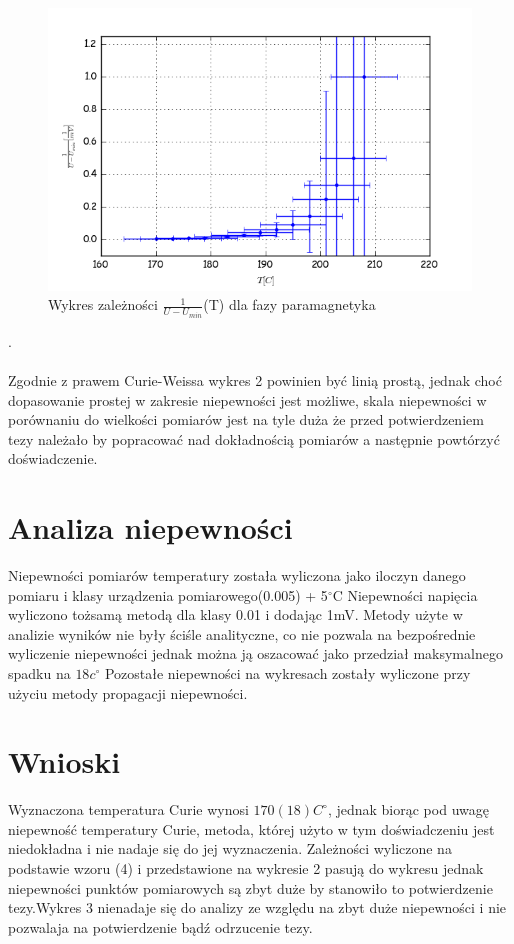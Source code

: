 \documentclass[a4paper,10pt]{article}
\begin{document}
\begin{figure}[H]
  \includegraphics{./Curie_odjete.png}
  \caption{Wykres zależności $\frac{1}{U-U_{min}}$(T) dla fazy paramagnetyka}
\end{figure}.
\\
\\Zgodnie z prawem Curie-Weissa wykres 2 powinien być linią prostą, jednak choć dopasowanie prostej w zakresie niepewności jest możliwe, skala niepewności w porównaniu do wielkości pomiarów jest na tyle duża że przed potwierdzeniem tezy należało by popracować nad dokładnością pomiarów a następnie powtórzyć doświadczenie.

\section{Analiza niepewności}
Niepewności pomiarów temperatury została wyliczona jako iloczyn danego pomiaru i klasy urządzenia pomiarowego(0.005) + 5$^\circ$C
Niepewności napięcia wyliczono tożsamą metodą dla klasy 0.01 i dodając 1mV. Metody użyte w analizie wyników nie były ściśle analityczne, co nie pozwala na bezpośrednie wyliczenie niepewności jednak można ją oszacować jako przedział maksymalnego spadku na $18c^\circ$ Pozostałe niepewności na wykresach zostały wyliczone przy użyciu metody propagacji niepewności.

\section{Wnioski}
Wyznaczona temperatura Curie wynosi $170(18)C^\circ$, jednak biorąc pod uwagę niepewność temperatury Curie, metoda, której użyto w tym doświadczeniu jest niedokładna i  nie nadaje się do jej wyznaczenia. Zależności wyliczone na podstawie wzoru (4) i przedstawione na wykresie 2 pasują do wykresu jednak niepewności punktów pomiarowych są zbyt duże by stanowiło to potwierdzenie tezy.Wykres 3 nienadaje się do analizy ze względu na zbyt duże niepewności i nie pozwalaja na potwierdzenie bądź odrzucenie tezy. 
\end{document}
